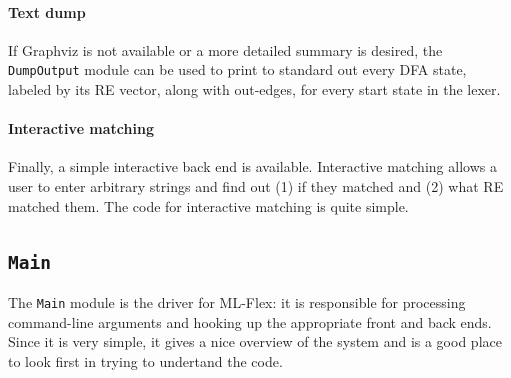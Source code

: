 \documentclass[11pt]{article}
\newcommand{\flex}{ML-Flex}
\newcommand{\nm}[1]{\texttt{#1}}
\begin{document}
\paragraph{Text dump}

If Graphviz is not available or a more detailed summary is desired, the
\nm{DumpOutput} module can be used to print to standard out every DFA state,
labeled by its RE vector, along with out-edges, for every start state in the
lexer.

\paragraph{Interactive matching}

Finally, a simple interactive back end is available.  Interactive matching
allows a user to enter arbitrary strings and find out (1) if they matched and
(2) what RE matched them.  The code for interactive matching is quite simple.

\subsection{\nm{Main}}

The \nm{Main} module is the driver for \flex{}: it is responsible for processing
command-line arguments and hooking up the appropriate front and back ends. 
Since it is very simple, it gives a nice overview of the system and is a good
place to look first in trying to undertand the code.



\end{document}
